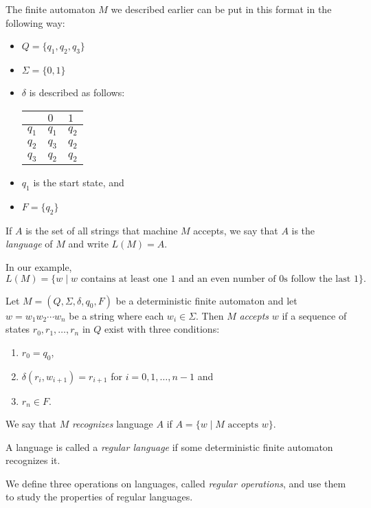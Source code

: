 \begin{example}
The finite automaton $M$ we described earlier can be put in this format in the following way: 
\begin{itemize}
	\item $Q=\{q_1,q_2,q_3\}$
	\item $\Sigma=\{0,1\}$
	\item $\delta$ is described as follows:
	\begin{center}
		\begin{tabular}{l|ll}
			& $0$  & $1$   \\ \hline
			$q_1$ & $q_1$   & $q_2$\\
			$q_2$ & $q_3$ & $q_2$\\
			$q_3$ & $q_2$ & $q_2$
		\end{tabular}
	\end{center}
	\item $q_1$ is the start state, and
	\item $F=\{q_2\}$
\end{itemize}
\end{example}

If $A$ is the set of all strings that machine $M$ accepts, we say that $A$ is the \textit{language} of $M$ and write $L(M)=A$.

In our example, $$L(M)=\{w\mid w\text{ contains at least one $1$ and an even number of $0$s follow the last $1$}\}.$$

\begin{definition}
Let $M=(Q,\Sigma, \delta, q_0, F)$ be a deterministic finite automaton and let $w=w_1w_2\cdots w_n$ be a string where each $w_i\in\Sigma$. Then $M$ \textit{accepts} $w$ if a sequence of states $r_0, r_1, \ldots, r_n$ in $Q$ exist with three conditions:
\begin{enumerate}
	\item $r_0=q_0$,
	\item $\delta(r_i, w_{i+1})=r_{i+1}$ for $i=0,1,\ldots, n-1$ and
	\item $r_n\in F$.
\end{enumerate}

We say that $M$ \textit{recognizes} language $A$ if $A=\{w\mid M\text{ accepts }w\}$.
\end{definition}
\begin{definition}
A language is called a \textit{regular language} if some deterministic finite automaton recognizes it.
\end{definition}

We define three operations on languages, called \textit{regular operations}, and use them to study the properties of regular languages.

